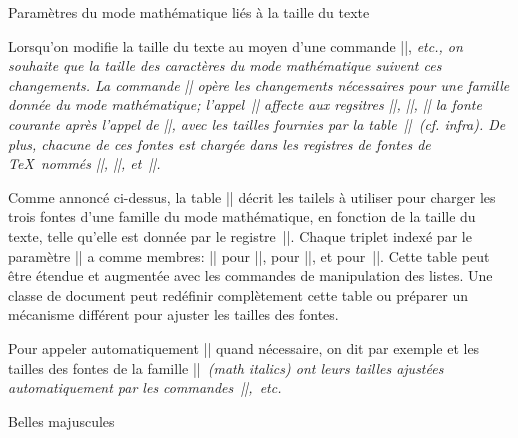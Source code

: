 \formalpar Paramètres du mode mathématique liés %
 à la taille du texte

Lorsqu'on modifie la taille du texte au moyen d'une commande
|\tenpoint|, \em{etc.}, on souhaite que la taille des caractères du
mode mathématique suivent ces changements. La commande
|\familysizeadjust| opère les changements nécessaires pour une famille
donnée du mode mathématique;
l'appel~|\familysizeadjust\mitfont\@ne\mit| affecte aux regsitres
|\textfont\@ne|, |\scriptfont\@ne|, |\scriptscriptfont\@ne| la fonte
courante après l'appel de |\mitfont|, avec les tailles fournies par la
table~|\familysizetable|~(cf. infra). De plus, chacune de ces fontes
est chargée dans les registres de fontes de \TeX\ nommés |\mittext|,
|\mitscript|, et~|\mitscriptscript|.

Comme annoncé ci-dessus, la table |\familysizetable| décrit les
tailels à utiliser pour charger les trois fontes d'une famille du mode
mathématique, en fonction de la taille du texte, telle qu'elle est
donnée par le registre~|\textsize|. Chaque triplet indexé par le
paramètre |\textsize| a comme membres: |\fontsize| pour |\textfont|,
pour |\scriptfont|, et pour~|\scriptscriptfont|.
\begincode
\def\familysizetable{%
  \\{{12}{{12pt}{8pt}{6pt}}}%
  \\{{11}{{11pt}{8pt}{6pt}}}%
  \\{{10}{{10pt}{7pt}{5pt}}}%
  \\{{9}{{9pt}{6pt}{5pt}}}%
  \\{{8}{{8pt}{6pt}{5pt}}}%
  \\{{7}{{7pt}{6pt}{5pt}}}%
  \\{{6}{{6pt}{5pt}{5pt}}}%
  \\{{5}{{5pt}{5pt}{5pt}}}%
}
\endcode
Cette table peut être étendue et augmentée avec les commandes de
manipulation des listes. Une classe de document peut redéfinir
complètement cette table ou préparer un mécanisme différent pour
ajuster les tailles des fontes.

Pour appeler automatiquement |\familysizeadjust| quand nécessaire, on
dit par exemple
\begincode
\addhook{\familysizeadjust\mitfont\@ne\mit}\to\mathsizeadjust
\endcode
et les tailles des fontes de la famille |\@ne|~\em{(math italics)} ont
leurs tailles ajustées automatiquement par les
commandes~|\tenpoint|,~\em{etc.}


\formalpar Belles majuscules


